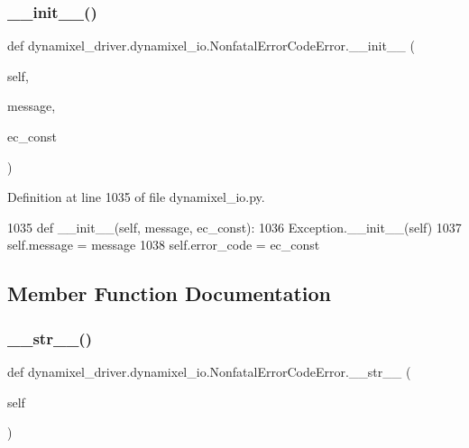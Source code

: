 \subsubsection{\texorpdfstring{\+\_\+\+\_\+init\+\_\+\+\_\+()}{\_\_init\_\_()}}
{\footnotesize\ttfamily def dynamixel\+\_\+driver.\+dynamixel\+\_\+io.\+Nonfatal\+Error\+Code\+Error.\+\_\+\+\_\+init\+\_\+\+\_\+ (\begin{DoxyParamCaption}\item[{}]{self,  }\item[{}]{message,  }\item[{}]{ec\+\_\+const }\end{DoxyParamCaption})}



Definition at line 1035 of file dynamixel\+\_\+io.\+py.


\begin{DoxyCode}
1035     \textcolor{keyword}{def }\_\_init\_\_(self, message, ec\_const):
1036         Exception.\_\_init\_\_(self)
1037         self.message = message
1038         self.error\_code = ec\_const
\end{DoxyCode}


\subsection{Member Function Documentation}
\mbox{\label{classdynamixel__driver_1_1dynamixel__io_1_1_nonfatal_error_code_error_ae4bac8dd12f9006453cfe75be376dc1e}} 
\subsubsection{\texorpdfstring{\+\_\+\+\_\+str\+\_\+\+\_\+()}{\_\_str\_\_()}}
{\footnotesize\ttfamily def dynamixel\+\_\+driver.\+dynamixel\+\_\+io.\+Nonfatal\+Error\+Code\+Error.\+\_\+\+\_\+str\+\_\+\+\_\+ (\begin{DoxyParamCaption}\item[{}]{self }\end{DoxyParamCaption})}



